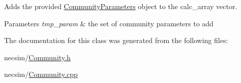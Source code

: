 Adds the provided \hyperlink{struct_community_parameters}{Community\+Parameters} object to the calc\+\_\+array vector. 


\begin{DoxyParams}{Parameters}
{\em tmp\+\_\+param} & the set of community parameters to add \\
\hline
\end{DoxyParams}


The documentation for this class was generated from the following files\+:\begin{DoxyCompactItemize}
\item 
necsim/\hyperlink{_community_8h}{Community.\+h}\item 
necsim/\hyperlink{_community_8cpp}{Community.\+cpp}\end{DoxyCompactItemize}
